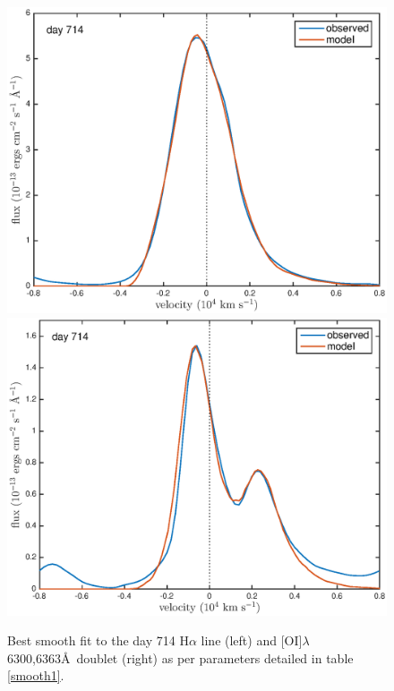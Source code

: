 \documentclass[useAMS,usenatbib,usegraphicx]{mnras}
\begin{document}
\begin{figure}
\begin{center}
\includegraphics[trim =37 10 45 15,clip=true,scale=0.51]{smooth/best_fit/d714Ha}
\includegraphics[trim =37 10 45 15,clip=true,scale=0.51]{smooth/best_fit/d714OI}
\caption{Best smooth fit to the day 714 H$\alpha$ line (left) and [OI]$\lambda$6300,6363\AA\ doublet (right) as per parameters detailed in table \ref{smooth1}.}
\label{d714bf}
\end{center}
\end{figure}
\end{document}
